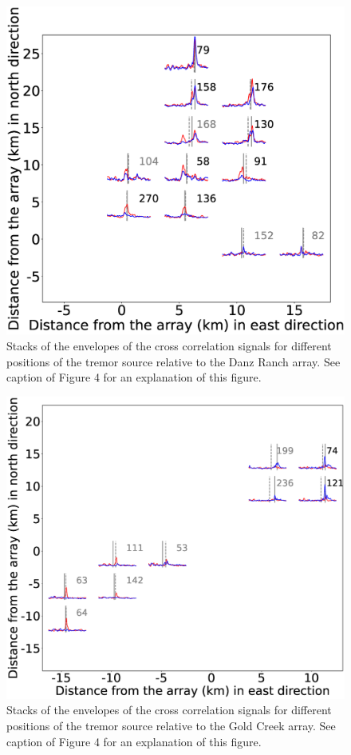 \documentclass[draft]{agujournal2019}
\begin{document}
\begin{figure}
\noindent\includegraphics[width=\textwidth, trim={1cm 0.5cm 2.5cm 1.5cm},clip]{figures/DR_PWS_PWS_0.eps}
\caption{Stacks of the envelopes of the cross correlation signals for different positions of the tremor source relative to the Danz Ranch array. See caption of Figure 4 for an explanation of this figure.}
\label{pngfiguresample}
\end{figure}

\begin{figure}
\noindent\includegraphics[width=\textwidth, trim={1.5cm 1cm 4.5cm 4cm},clip]{figures/GC_PWS_PWS_0.eps}
\caption{Stacks of the envelopes of the cross correlation signals for different positions of the tremor source relative to the Gold Creek array. See caption of Figure 4 for an explanation of this figure.}
\label{pngfiguresample}
\end{figure}
\end{document}
